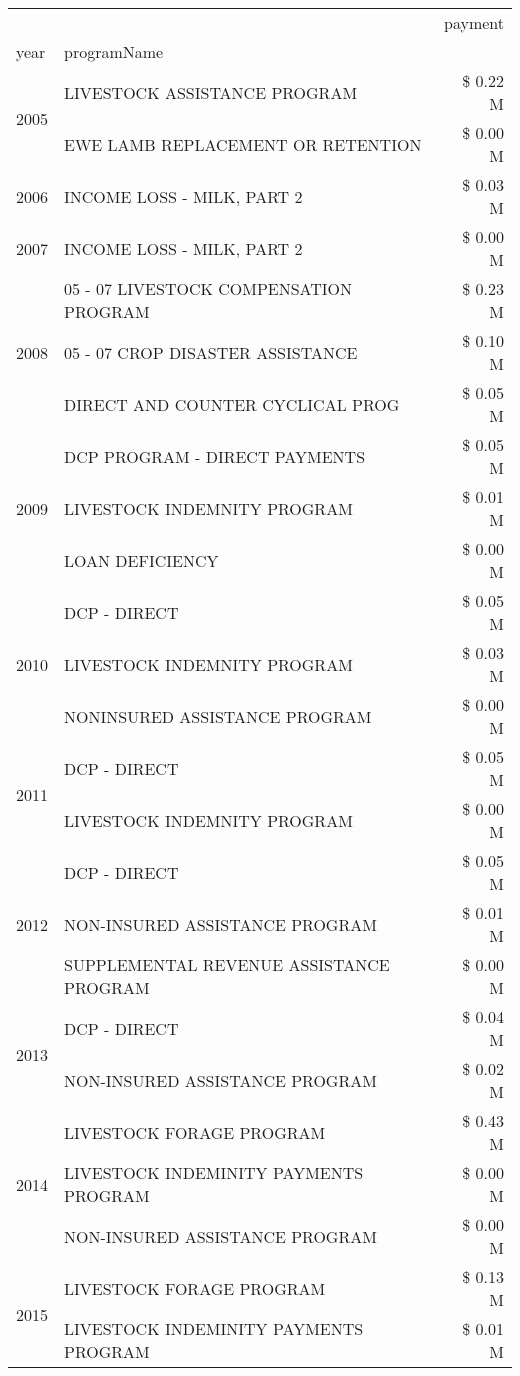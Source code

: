 \begin{tabular}{llr}
\toprule
 &  & payment \\
year & programName &  \\
\midrule
\multirow[t]{2}{*}{2005} & LIVESTOCK ASSISTANCE PROGRAM & \$ 0.22 M \\
 & EWE LAMB REPLACEMENT OR RETENTION & \$ 0.00 M \\
\cline{1-3}
2006 & INCOME LOSS - MILK, PART 2 & \$ 0.03 M \\
\cline{1-3}
2007 & INCOME LOSS - MILK, PART 2 & \$ 0.00 M \\
\cline{1-3}
\multirow[t]{3}{*}{2008} & 05 - 07 LIVESTOCK COMPENSATION PROGRAM & \$ 0.23 M \\
 & 05 - 07 CROP DISASTER ASSISTANCE & \$ 0.10 M \\
 & DIRECT AND COUNTER CYCLICAL PROG & \$ 0.05 M \\
\cline{1-3}
\multirow[t]{3}{*}{2009} & DCP PROGRAM - DIRECT PAYMENTS & \$ 0.05 M \\
 & LIVESTOCK INDEMNITY PROGRAM & \$ 0.01 M \\
 & LOAN DEFICIENCY & \$ 0.00 M \\
\cline{1-3}
\multirow[t]{3}{*}{2010} & DCP - DIRECT & \$ 0.05 M \\
 & LIVESTOCK INDEMNITY PROGRAM & \$ 0.03 M \\
 & NONINSURED ASSISTANCE PROGRAM & \$ 0.00 M \\
\cline{1-3}
\multirow[t]{2}{*}{2011} & DCP - DIRECT & \$ 0.05 M \\
 & LIVESTOCK INDEMNITY PROGRAM & \$ 0.00 M \\
\cline{1-3}
\multirow[t]{3}{*}{2012} & DCP - DIRECT & \$ 0.05 M \\
 & NON-INSURED ASSISTANCE PROGRAM & \$ 0.01 M \\
 & SUPPLEMENTAL REVENUE ASSISTANCE PROGRAM & \$ 0.00 M \\
\cline{1-3}
\multirow[t]{2}{*}{2013} & DCP - DIRECT & \$ 0.04 M \\
 & NON-INSURED ASSISTANCE PROGRAM & \$ 0.02 M \\
\cline{1-3}
\multirow[t]{3}{*}{2014} & LIVESTOCK FORAGE PROGRAM & \$ 0.43 M \\
 & LIVESTOCK INDEMINITY PAYMENTS PROGRAM & \$ 0.00 M \\
 & NON-INSURED ASSISTANCE PROGRAM & \$ 0.00 M \\
\cline{1-3}
\multirow[t]{2}{*}{2015} & LIVESTOCK FORAGE PROGRAM & \$ 0.13 M \\
 & LIVESTOCK INDEMINITY PAYMENTS PROGRAM & \$ 0.01 M \\

\end{tabular}
